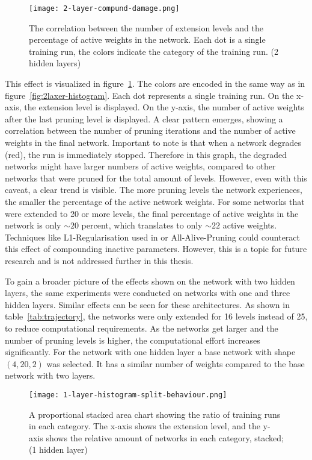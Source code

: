\begin{figure}[ht] %
    \centering
    \texttt{[image: 2-layer-compund-damage.png]}
    \caption[Correlation extension levels and rate of active weights]{
    The correlation between the number of extension levels and the percentage of active weights in the network.
    Each dot is a single training run, the colors indicate the category of the training run. (2 hidden layers)
    }\label{fig:collateral_damage}
\end{figure}

This effect is visualized in figure~\ref{fig:collateral_damage}.
The colors are encoded in the same way as in figure~\ref{fig:2laxer-histogram}.
Each dot represents a single training run. 
On the x-axis, the extension level is displayed.
On the y-axis, the number of active weights after the last pruning level is displayed.
A clear pattern emerges, showing a correlation between the number of pruning iterations and the number of active weights in the final network.
Important to note is that when a network degrades (red), the run is immediately stopped.
Therefore in this graph, the degraded networks might have larger numbers of active weights, compared to other networks that were pruned for the total amount of levels.
However, even with this caveat, a clear trend is visible.
The more pruning levels the network experiences, the smaller the percentage of the active network weights.
For some networks that were extended to 20 or more levels, the final percentage of active weights in the network is only $\sim20$ percent, which translates to only $\sim22$ active weights.
Techniques like L1-Regularisation used in \autocite{HanEtAl15} or All-Alive-Pruning \autocite{AllAlivePruning} could counteract this effect of compounding inactive parameters.
However, this is a topic for future research and is not addressed further in this thesis. 

To gain a broader picture of the effects shown on the network with two hidden layers, the same experiments were conducted on networks with one and three hidden layers.
Similar effects can be seen for these architectures.
As shown in table~\ref{tab:trajectory}, the networks were only extended for 16 levels instead of 25, to reduce computational requirements. 
As the networks get larger and the number of pruning levels is higher, the computational effort increases significantly.
For the network with one hidden layer a base network with shape $(4,20,2)$ was selected.
It has a similar number of weights compared to the base network with two layers.
\begin{figure}[t] %
    \centering
    \texttt{[image: 1-layer-histogram-split-behaviour.png]}
    \caption[Separation/Degradation Stacked Area Chart (1 hidden layer)]{       
        A proportional stacked area chart showing the ratio of training runs in each category.
        The x-axis shows the extension level, and the y-axis shows the relative amount of networks in each category, stacked; (1 hidden layer)
        }\label{fig:1layer-histogram}
\end{figure}

